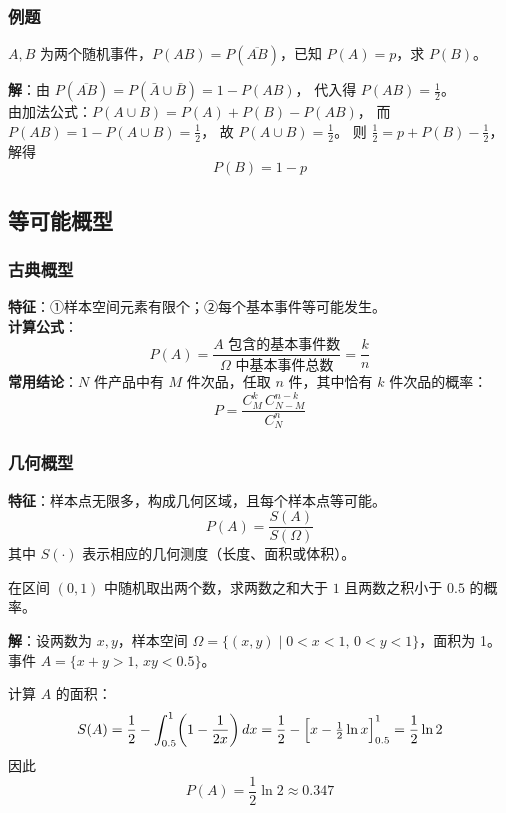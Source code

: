 \documentclass[12pt, a4paper]{article}
\begin{document}
\subsubsection{例题}

\begin{tcolorbox}[exbox, title={例题：利用公式求概率}]
    $A, B$ 为两个随机事件，$P(AB) = P(\overline{AB})$，已知 $P(A)=p$，求 $P(B)$。

    \textbf{解}：由 $P(\overline{AB}) = P(\bar{A}\cup\bar{B}) = 1-P(AB)$，
    代入得 $P(AB)=\tfrac{1}{2}$。\\
    由加法公式：$P(A\cup B)=P(A)+P(B)-P(AB)$，
    而 $P(AB)=1-P(A\cup B)=\tfrac{1}{2}$，
    故 $P(A\cup B)=\tfrac{1}{2}$。
    则 $\tfrac{1}{2}=p+P(B)-\tfrac{1}{2}$，解得
    \[\boxed{P(B)=1-p}\]
\end{tcolorbox}

\subsection{等可能概型}

\subsubsection{古典概型}

\begin{tcolorbox}[defbox, title={古典概型}]
    \textbf{特征}：①样本空间元素有限个；②每个基本事件等可能发生。\\[4pt]
    \textbf{计算公式}：
    \[
        P(A) = \frac{A \text{ 包含的基本事件数}}{\Omega \text{ 中基本事件总数}} = \frac{k}{n}
    \]
    \textbf{常用结论}：$N$ 件产品中有 $M$ 件次品，任取 $n$ 件，其中恰有 $k$ 件次品的概率：
    \[
        P = \frac{C_M^k\, C_{N-M}^{n-k}}{C_N^n}
    \]
\end{tcolorbox}

\subsubsection{几何概型}

\begin{tcolorbox}[defbox, title={几何概型}]
    \textbf{特征}：样本点无限多，构成几何区域，且每个样本点等可能。\\[4pt]
    \[
        P(A) = \frac{S(A)}{S(\Omega)}
    \]
    其中 $S(\cdot)$ 表示相应的几何测度（长度、面积或体积）。
\end{tcolorbox}

\begin{tcolorbox}[exbox, title={例题：几何概型}]
    在区间 $(0,1)$ 中随机取出两个数，求两数之和大于 $1$ 且两数之积小于 $0.5$ 的概率。

    \textbf{解}：设两数为 $x, y$，样本空间 $\Omega = \{(x,y)\mid 0<x<1,\,0<y<1\}$，面积为 1。
    事件 $A = \{x+y>1,\, xy<0.5\}$。

    计算 $A$ 的面积：
    \[
        S(A) = \frac{1}{2} - \int_{0.5}^{1}\!\left(1 - \frac{1}{2x}\right)dx
        = \frac{1}{2} - \Bigl[x - \tfrac{1}{2}\ln x\Bigr]_{0.5}^{1}
        = \frac{1}{2}\ln 2
    \]
    因此
    \[
        P(A) = \frac{1}{2}\ln 2 \approx 0.347
    \]
\end{tcolorbox}
\end{document}

